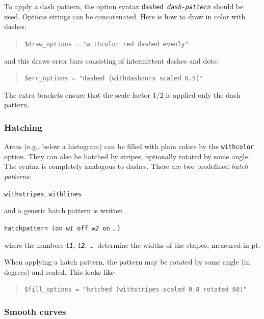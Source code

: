 \documentclass[12pt]{book}
\newcommand{\ttt}[1]{\texttt{#1}}
\begin{document}
To apply a dash pattern, the option syntax \ttt{dashed \emph{dash-pattern}}
should be used.  Options strings can be concatenated.  Here is how to draw in
color with dashes:
\begin{quote}
  \begin{footnotesize}
    \ttt{\$draw\_options = "withcolor red dashed evenly"}   
  \end{footnotesize}
\end{quote}
and this draws error bars consisting of intermittent dashes and
dots:
\begin{quote}
  \begin{footnotesize}
    \ttt{\$err\_options = "dashed (withdashdots scaled 0.5)"}
  \end{footnotesize}
\end{quote}
The extra brackets ensure that the scale factor $1/2$ is applied only the dash
pattern.


\subsubsection{Hatching}

Areas (e.g., below a histogram) can be filled with plain colors by the
\ttt{withcolor} option.  They can also be hatched by stripes, optionally
rotated by some angle.  The syntax is completely analogous to dashes.  There
are two predefined \emph{hatch patterns}:
\begin{center}
   \ttt{withstripes}, \ttt{withlines}
\end{center}
and a generic hatch pattern is written
\begin{center}
  \ttt{hatchpattern (on \emph{w1} off \emph{w2} on} \ldots \ttt{)}
\end{center}
where the numbers \ttt{\emph{l1}}, \ttt{\emph{l2}}, \ldots\ determine the
widths of the stripes, measured in pt.

When applying a hatch pattern, the pattern may be rotated by some angle (in
degrees) and scaled.  This looks like
\begin{quote}
  \begin{footnotesize}
    \ttt{\$fill\_options = "hatched (withstripes scaled 0.8 rotated 60)"}
  \end{footnotesize}
\end{quote}


\subsubsection{Smooth curves}
\end{document}
